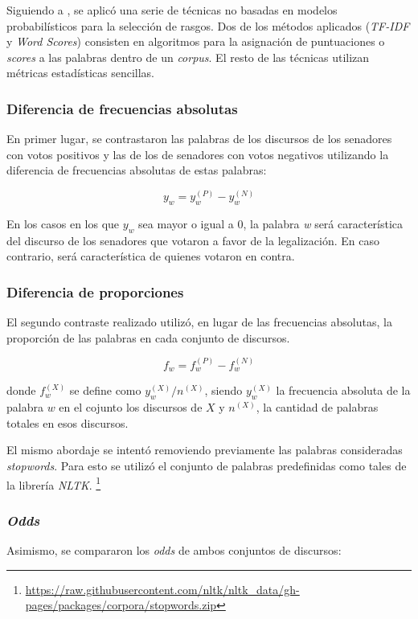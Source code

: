Siguiendo a \cite{monroe2008fightin}, se aplic\'o una serie de t\'ecnicas
no basadas en modelos probabil\'isticos para la selecci\'on de rasgos.
Dos de los m\'etodos aplicados (\textit{TF-IDF} y \textit{Word Scores}) consisten
en algoritmos para la asignaci\'on de puntuaciones o \textit{scores} a las
palabras dentro de un \textit{corpus}. El resto de las t\'ecnicas utilizan
m\'etricas estad\'isticas sencillas.

\subsubsection{Diferencia de frecuencias absolutas}
En primer lugar, se contrastaron las palabras de los discursos de los
senadores con votos positivos y las de los de senadores con votos negativos
utilizando la diferencia de frecuencias absolutas de estas palabras:

\begin{equation*}
y_w = y_{w}^{(P)}-y_{w}^{(N)}
\end{equation*}

En los casos en los que $y_{w}$ sea mayor o igual a $0$, la palabra
\textit{w} ser\'a caracter\'istica del discurso de los senadores que votaron a
favor de la legalizaci\'on. En caso contrario, ser\'a caracter\'istica de quienes
votaron en contra.

\subsubsection{Diferencia de proporciones}
El segundo contraste realizado utiliz\'o, en lugar de las frecuencias absolutas,
la proporci\'on de las palabras en cada conjunto de discursos.

\begin{equation*}
    f_w = f_{w}^{(P)}-f_{w}^{(N)}
\end{equation*}


donde $f_{w}^{(X)}$ se define como $y_{w}^{(X)} / n^{(X)}$, siendo $y_{w}^{(X)}$
la frecuencia absoluta de la palabra $w$ en el cojunto los discursos de $X$
y $n^{(X)}$, la cantidad de palabras totales en esos discursos.

El mismo abordaje se intent\'o removiendo previamente las palabras consideradas
\textit{stopwords}. Para esto se utiliz\'o el conjunto de palabras predefinidas
como tales de la librer\'ia \textit{NLTK}.
\footnote{\url{https://raw.githubusercontent.com/nltk/nltk_data/gh-pages/packages/corpora/stopwords.zip}}

\subsubsection{\textit{Odds}}
Asimismo, se compararon los \textit{odds} de ambos conjuntos de discursos:

